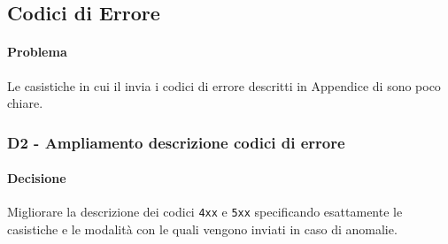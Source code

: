 \subsection{Codici di Errore}\label{pCod}
\paragraph{Problema}
Le casistiche in cui il  invia i codici di errore descritti in Appendice di \DP sono poco chiare.
\subsubsection{\textbf{D2} - Ampliamento descrizione codici di errore}\label{dCod}
\paragraph{Decisione}
Migliorare la descrizione dei codici \texttt{4xx} e \texttt{5xx} specificando esattamente le casistiche e le modalità con le quali vengono inviati in caso di anomalie.
